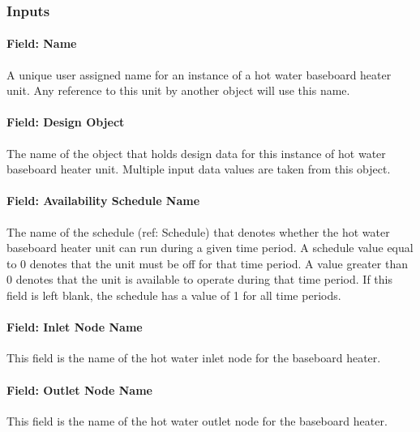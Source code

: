 \subsubsection{Inputs}\label{inputs-038}

\paragraph{Field: Name}\label{field-name-037}

A unique user assigned name for an instance of a hot water baseboard heater unit. Any reference to this unit by another object will use this name.

\paragraph{Field: Design Object}\label{HW_Baseboard_DesignObjectName}

The name of the object that holds design data for this instance of hot water baseboard heater unit. Multiple input data values are taken from this object.

\paragraph{Field: Availability Schedule Name}\label{field-availability-schedule-name-013}

The name of the schedule (ref: Schedule) that denotes whether the hot water baseboard heater unit can run during a given time period. A schedule value equal to 0 denotes that the unit must be off for that time period. A value greater than 0 denotes that the unit is available to operate during that time period. If this field is left blank, the schedule has a value of 1 for all time periods.

\paragraph{Field: Inlet Node Name}\label{field-inlet-node-name-006}

This field is the name of the hot water inlet node for the baseboard heater.

\paragraph{Field: Outlet Node Name}\label{field-outlet-node-name-007}

This field is the name of the hot water outlet node for the baseboard heater.

